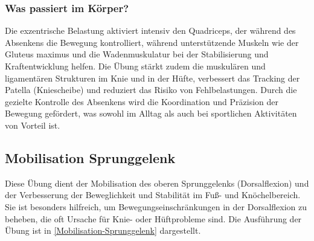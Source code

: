 \subsubsection{Was passiert im Körper?}
Die exzentrische Belastung aktiviert intensiv den Quadriceps, der während des Absenkens die Bewegung kontrolliert, während unterstützende Muskeln wie der Gluteus maximus und die Wadenmuskulatur bei der Stabilisierung und Kraftentwicklung helfen.
Die Übung stärkt zudem die muskulären und ligamentären Strukturen im Knie und in der Hüfte, verbessert das Tracking der Patella (Kniescheibe) und reduziert das Risiko von Fehlbelastungen.
Durch die gezielte Kontrolle des Absenkens wird die Koordination und Präzision der Bewegung gefördert, was sowohl im Alltag als auch bei sportlichen Aktivitäten von Vorteil ist.




\subsection{Mobilisation Sprunggelenk}

Diese Übung dient der Mobilisation des oberen Sprunggelenks (Dorsalflexion) und der Verbesserung der Beweglichkeit und Stabilität im Fuß- und Knöchelbereich. Sie ist besonders hilfreich, um Bewegungseinschränkungen in der Dorsalflexion zu beheben, die oft Ursache für Knie- oder Hüftprobleme sind.
Die Ausführung der Übung ist in \autoref{Mobilisation-Sprunggelenk} dargestellt.


